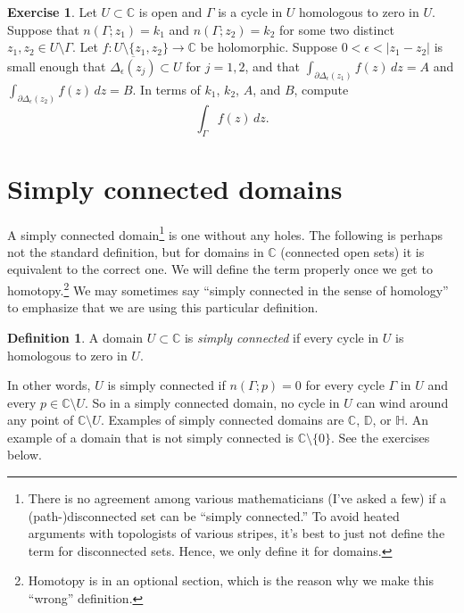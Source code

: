 \documentclass[12pt,openany]{book}
\newcommand{\sabs}[1]{\lvert {#1} \rvert}
\newcommand{\C}{{\mathbb{C}}}
\newcommand{\D}{{\mathbb{D}}}
\newcommand{\bH}{{\mathbb{H}}}
\newcommand{\myindex}[1]{#1\index{#1}}
\newcommand{\myquote}[1]{``#1''}
\theoremstyle{plain}
\theoremstyle{remark}
\theoremstyle{definition}
\newtheorem{defn}[thm]{Definition}
\newenvironment{exbox}{%
    \def\FrameCommand{\vrule width 1pt \relax\hspace{10pt}}%
    \MakeFramed{\advance\hsize-\width\FrameRestore}%
}{%
    \endMakeFramed
}
\theoremstyle{exercise}
\newtheorem{exercise}{Exercise}[section]
\theoremstyle{example}
\begin{document}
\begin{exbox}
\begin{exercise}
Let $U \subset \C$ is open and $\Gamma$ is a cycle in $U$
homologous to zero in $U$.
Suppose that $n(\Gamma;z_1) = k_1$ and  $n(\Gamma;z_2) = k_2$ for
some two distinct $z_1,z_2 \in U \setminus \Gamma$.
Let $f \colon U \setminus \{z_1,z_2\} \to \C$ be
holomorphic.
Suppose $0< \epsilon < \sabs{z_1-z_2}$ is small enough that
$\overline{\Delta_\epsilon(z_j)} \subset U$ for $j=1,2$,
and that
$\int_{\partial \Delta_\epsilon(z_1)} f(z) \, dz = A$ and 
$\int_{\partial \Delta_\epsilon(z_2)} f(z) \, dz = B$.
In terms of $k_1$, $k_2$, $A$, and $B$,
compute
\begin{equation*}
\int_{\Gamma} f(z) \, dz .
\end{equation*}
\end{exercise}
\end{exbox}



\section{Simply connected domains}

A simply connected domain\footnote{%
There is no agreement among various mathematicians (I've asked a few) if
a (path-)disconnected set can be \myquote{simply connected.}
To avoid heated arguments with topologists of various stripes,
it's best to just not define the term for disconnected sets.
Hence, we only define it for domains.}
is one without any holes.  The following is
perhaps not the standard definition, but for domains in $\C$
(connected open sets)
it is equivalent to the correct one.
We will define the term properly once we get 
to homotopy.\footnote{Homotopy is in an optional section, which is the
reason why we make this \myquote{wrong} definition.}
We may sometimes say
\myquote{simply connected in the sense of homology}
to emphasize that we are using this particular definition.

\begin{defn} \label{defn:simplyconnected:homology}
A domain $U \subset \C$ is \emph{\myindex{simply connected}}
if every cycle in $U$
is homologous to zero in $U$.
\end{defn}

In other words, $U$ is simply connected
if $n(\Gamma;p) = 0$ for every cycle $\Gamma$ in $U$ and
every $p \in \C \setminus U$.
So in a simply connected domain, no cycle in $U$ can wind around any point
of $\C \setminus U$.  Examples of simply connected domains are $\C$, $\D$, or
$\bH$.  An example of a domain that is not simply connected is
$\C \setminus \{ 0 \}$.
See the exercises below.
\end{document}
